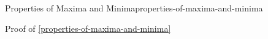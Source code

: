 \begin{proposition}{Properties of Maxima and Minima}{properties-of-maxima-and-minima}
\begin{enumerate}
    \end{enumerate}
\end{proposition}
\begin{Proof}{Proof of \cref{properties-of-maxima-and-minima}}%
\end{Proof}
\begin{appendices}

\end{appendices}

